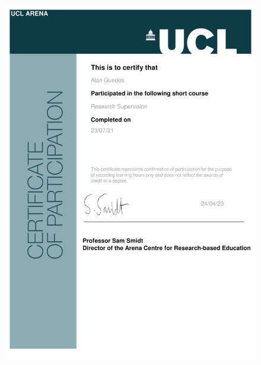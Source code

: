 \documentclass[10pt,a4paper,sans,colorlinks]{moderncv}
\begin{document}
\begin{figure}
    \centering
    \includegraphics[align=t,width=\textwidth,height=0.3\paperheight, keepaspectratio=true]{certificates/ucl-training/Research_Supervision.pdf}

\end{figure}
\end{document}
